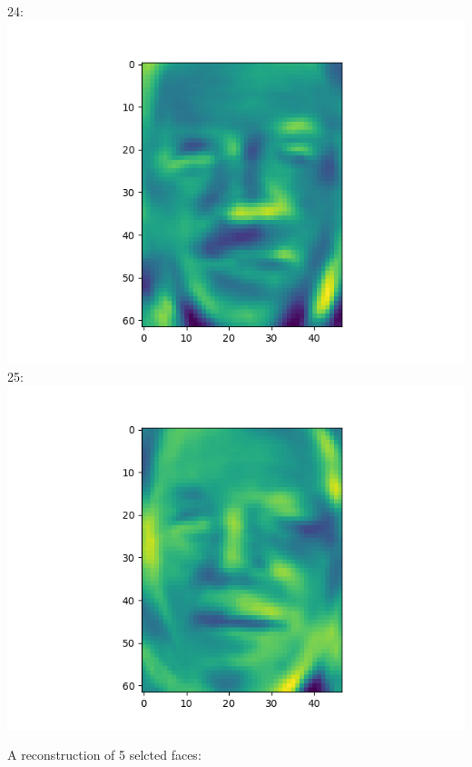 \documentclass[twoside,10pt]{article}
\theoremstyle{definition}
\theoremstyle{definition}
\theoremstyle{remark}
\renewcommand{\>}{{\rightarrow}}
\newcommand{\1}{{\mathbf 1}}
\newcommand{\0}{{\mathbf 0}}
\begin{document}
\begin{enumerate}
  24:
  \includegraphics[width=\textwidth]{eigenface_24.png}
  25:
  \includegraphics[width=\textwidth]{eigenface_25.png}
  
  A reconstruction of 5 selcted faces:


\end{enumerate}
\end{document}
